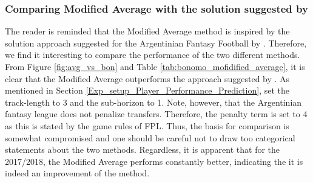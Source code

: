 \subsubsection{Comparing Modified Average with the solution suggested by \cite{Bonomo}}



The reader is reminded that the Modified Average method is inspired by the solution approach suggested for the Argentinian Fantasy Football by \cite{Bonomo}. Therefore, we find it interesting to compare the performance of the two different methods. From Figure \ref{fig:avg_vs_bon} and Table \ref{tab:bonomo_mofidified_average}, it is clear that the Modified Average outperforms the approach suggested by \cite{Bonomo}. As mentioned in Section \ref{Exp_setup_Player_Performance_Prediction}, \cite{Bonomo} set the track-length to 3 and the sub-horizon to 1. Note, however, that the Argentinian fantasy league does not penalize transfers. Therefore, the penalty term is set to 4 as this is stated by the game rules of FPL. Thus, the basis for comparison is somewhat compromised and one should be careful not to draw too categorical statements about the two methods. Regardless, it is apparent that for the 2017/2018, the Modified Average performs constantly better, indicating the it is indeed an improvement of the method.

